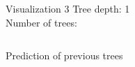 \begin{frame}{Visualization 3}
Tree depth: 1 \\
Number of trees: 

\begin{columns}
  \begin{column}{0.49\textwidth}
    \begin{center}
    Prediction of previous trees 

\end{center}
\end{column}
\end{columns}
\end{frame}
